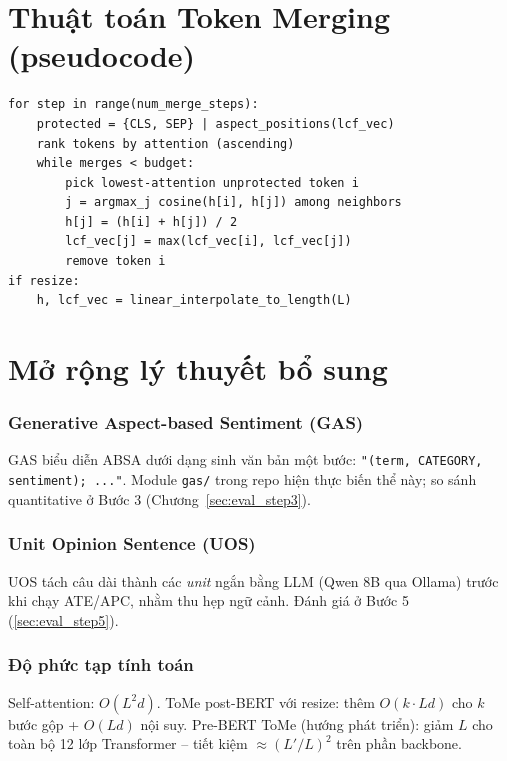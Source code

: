 \chapter{Thuật toán Token Merging (pseudocode)}
\label{app:tome_algo}

\begin{lstlisting}[caption={Attention-weighted ToMe (tom tat tu tom\_e\_1d.py)}]
for step in range(num_merge_steps):
    protected = {CLS, SEP} | aspect_positions(lcf_vec)
    rank tokens by attention (ascending)
    while merges < budget:
        pick lowest-attention unprotected token i
        j = argmax_j cosine(h[i], h[j]) among neighbors
        h[j] = (h[i] + h[j]) / 2
        lcf_vec[j] = max(lcf_vec[i], lcf_vec[j])
        remove token i
if resize:
    h, lcf_vec = linear_interpolate_to_length(L)
\end{lstlisting}

\chapter{Mở rộng lý thuyết bổ sung}
\label{app:theory_extra}

\subsection{Generative Aspect-based Sentiment (GAS)}

GAS \cite{zhang2021gas} biểu diễn ABSA dưới dạng sinh văn bản một bước:
\texttt{"(term, CATEGORY, sentiment); ..."}. Module \texttt{gas/} trong repo hiện thực
biến thể này; so sánh quantitative ở Bước 3 (Chương~\ref{sec:eval_step3}).

\subsection{Unit Opinion Sentence (UOS)}

UOS tách câu dài thành các \emph{unit} ngắn bằng LLM (Qwen 8B qua Ollama) trước khi
chạy ATE/APC, nhằm thu hẹp ngữ cảnh. Đánh giá ở Bước 5 (\ref{sec:eval_step5}).

\subsection{Độ phức tạp tính toán}

Self-attention: $O(L^2 d)$. ToMe post-BERT với resize: thêm $O(k \cdot L d)$ cho $k$ bước
gộp + $O(L d)$ nội suy. Pre-BERT ToMe (hướng phát triển): giảm $L$ cho toàn bộ 12 lớp
Transformer -- tiết kiệm $\approx (L'/L)^2$ trên phần backbone.
